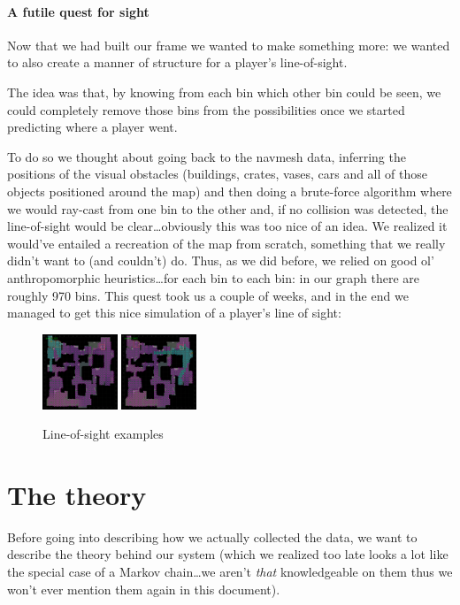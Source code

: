 \documentclass[9pt, a4paper]{IEEEtran}
\begin{document}
    \paragraph*{A futile quest for sight}
    Now that we had built our frame we wanted to make something more: we wanted to also create a manner of structure for a player's line-of-sight.

    The idea was that, by knowing from each bin which other bin could be seen, we could completely remove those bins from the possibilities once we started predicting where a player went.
    
    To do so we thought about going back to the navmesh data, inferring the positions of the visual obstacles (buildings, crates, vases, cars and all of those objects positioned around the map) and then doing a brute-force algorithm where we would ray-cast from one bin to the other and, if no collision was detected, the line-of-sight would be clear\dots obviously this was too nice of an idea. We realized it would've entailed a recreation of the map from scratch, something that we really didn't want to (and couldn't) do.
    Thus, as we did before, we relied on good ol' anthropomorphic heuristics\dots for each bin to each bin: in our graph there are roughly 970 bins. This quest took us a couple of weeks, and in the end we managed to get this nice simulation of a player's line of sight:

    \begin{figure}[h]
        \caption{Line-of-sight examples}
        \centering
        \includegraphics[width=0.2\textwidth]{images/view_B.png}
        \includegraphics[width=0.2\textwidth]{images/view_car.png}
    \end{figure}

    \section{The theory}
    Before going into describing how we actually collected the data, we want to describe the theory behind our system (which we realized too late looks a lot like the special case of a Markov chain\dots we aren't \emph{that} knowledgeable on them thus we won't ever mention them again in this document).
\end{document}

